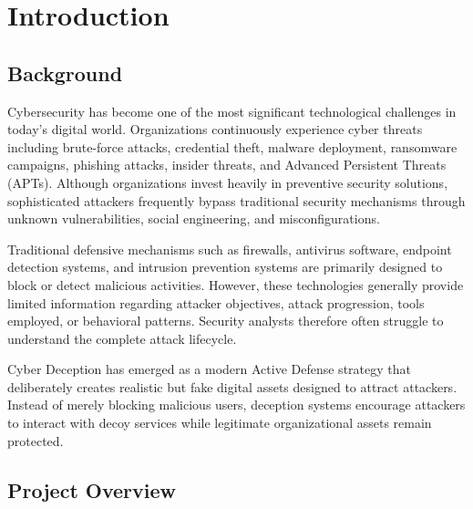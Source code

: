 \documentclass[12pt,a4paper]{report}
\begin{document}
\clearpage


\tableofcontents

\clearpage


\chapter{Introduction}

\section{Background}

Cybersecurity has become one of the most significant technological challenges in today's digital world. Organizations continuously experience cyber threats including brute-force attacks, credential theft, malware deployment, ransomware campaigns, phishing attacks, insider threats, and Advanced Persistent Threats (APTs). Although organizations invest heavily in preventive security solutions, sophisticated attackers frequently bypass traditional security mechanisms through unknown vulnerabilities, social engineering, and misconfigurations.

Traditional defensive mechanisms such as firewalls, antivirus software, endpoint detection systems, and intrusion prevention systems are primarily designed to block or detect malicious activities. However, these technologies generally provide limited information regarding attacker objectives, attack progression, tools employed, or behavioral patterns. Security analysts therefore often struggle to understand the complete attack lifecycle.

Cyber Deception has emerged as a modern Active Defense strategy that deliberately creates realistic but fake digital assets designed to attract attackers. Instead of merely blocking malicious users, deception systems encourage attackers to interact with decoy services while legitimate organizational assets remain protected.


\section{Project Overview}
\end{document}

